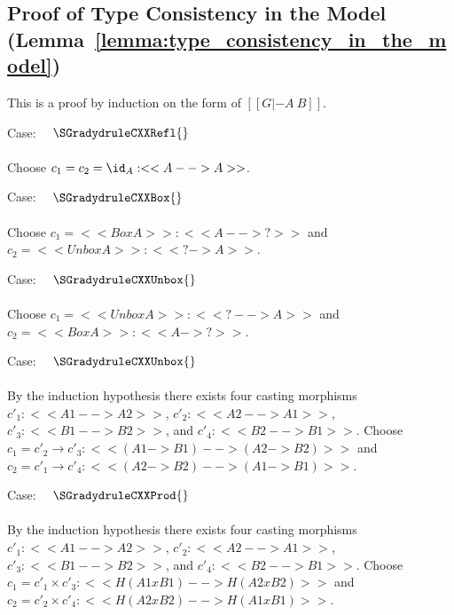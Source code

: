 \subsection{Proof of Type Consistency in the Model (Lemma~\ref{lemma:type_consistency_in_the_model})}
\label{subsec:proof_of_type_consistency_in_the_model}
This is a proof by induction on the form of $[[G |- A ~ B]]$.
\begin{description}
\item Case: $\quad \SGradydruleCXXRefl{}$\\
  \ \\
  \noindent  
  Choose $c_1 = c_2 = \id_A : <<A --> A>>$.
  \ \\
\item Case: $\quad \SGradydruleCXXBox{}$\\
  \ \\
  \noindent
  Choose $c_1 = <<Box A>> : <<A --> ?>>$ and $c_2 = <<Unbox A>> : <<? -> A>>$.
  \ \\
\item Case: $\quad \SGradydruleCXXUnbox{}$\\
  \ \\
  \noindent
  Choose $c_1 = <<Unbox A>> : <<? --> A>>$ and $c_2 = <<Box A>> : <<A -> ?>>$.
  \ \\
\item Case: $\quad \SGradydruleCXXUnbox{}$\\
  \ \\
  \noindent  
  By the induction hypothesis there exists four casting morphisms
  $c'_1 : <<A1 --> A2>>$, $c'_2 : <<A2 --> A1>>$, $c'_3 : <<B1 --> B2>>$,
  and $c'_4 : <<B2 --> B1>>$.  Choose
  $c_1 = c'_2 \to c'_3 : <<(A1 -> B1) --> (A2 -> B2)>>$
  and
  $c_2 = c'_1 \to c'_4 : <<(A2 -> B2) --> (A1 -> B1)>>$.
  \ \\
\item Case: $\quad \SGradydruleCXXProd{}$\\
  \ \\
  \noindent  
  By the induction hypothesis there exists four casting morphisms
  $c'_1 : <<A1 --> A2>>$, $c'_2 : <<A2 --> A1>>$, $c'_3 : <<B1 --> B2>>$,
  and $c'_4 : <<B2 --> B1>>$.
  Choose
  $c_1 = c'_1 \times c'_3 : <<H(A1 x B1) --> H(A2 x B2)>>$
  and
  $c_2 = c'_2 \times c'_4 : <<H(A2 x B2) --> H(A1 x B1)>>$.
\end{description}

